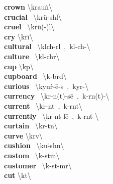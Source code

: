\documentclass[10pt,a4paper]{article}
\begin{document}
\begin{multicols}{2}
\textbf{ crown }\quad \textbackslash \textprimstress krau\. n\textbackslash \\
\textbf{ crucial }\quad \ \textbackslash \textprimstress kr\"{u}-sh\textschwa l\textbackslash \\
\textbf{ cruel }\quad \ \textbackslash \textprimstress kr\"{u}(-\textschwa )l\textbackslash \\
\textbf{ cry }\quad \textbackslash \textprimstress kr\={i}\textbackslash \\
\textbf{ cultural }\quad \ \textbackslash \textprimstress k\textschwa lch-r\textschwa l\ ,\ \textprimstress k\textschwa l-ch\textschwa -\textbackslash \\
\textbf{ culture }\quad \ \textbackslash \textprimstress k\textschwa l-ch\textschwa r\textbackslash \\
\textbf{ cup }\quad \textbackslash \textprimstress k\textschwa p\textbackslash \\
\textbf{ cupboard }\quad \ \textbackslash \textprimstress k\textschwa -b\textschwa rd\textbackslash \\
\textbf{ curious }\quad \ \textbackslash \textprimstress kyu\. r-\={e}-\textschwa s\ ,\ \textprimstress ky\textschwa r-\textbackslash \\
\textbf{ currency }\quad \ \textbackslash \textprimstress k\textschwa r-\textschwa n(t)-s\={e}\ ,\ \textprimstress k\textschwa -r\textschwa n(t)-\textbackslash \\
\textbf{ current }\quad \ \textbackslash \textprimstress k\textschwa r-\textschwa nt\ ,\ \textprimstress k\textschwa -r\textschwa nt\textbackslash \\
\textbf{ currently }\quad \ \textbackslash \textprimstress k\textschwa r-\textschwa nt-l\={e}\ ,\ \textprimstress k\textschwa -r\textschwa nt-\textbackslash \\
\textbf{ curtain }\quad \ \textbackslash \textprimstress k\textschwa r-t\textsuperscript{\textreve}n\textbackslash \\
\textbf{ curve }\quad \textbackslash \textprimstress k\textschwa rv\textbackslash \\
\textbf{ cushion }\quad \ \textbackslash \textprimstress ku\. -sh\textschwa n\textbackslash \\
\textbf{ custom }\quad \ \textbackslash \textprimstress k\textschwa -st\textschwa m\textbackslash \\
\textbf{ customer }\quad \ \textbackslash \textprimstress k\textschwa -st\textschwa -m\textschwa r\textbackslash \\
\textbf{ cut }\quad \textbackslash \textprimstress k\textschwa t\textbackslash \\

\end{multicols}
\end{document}
